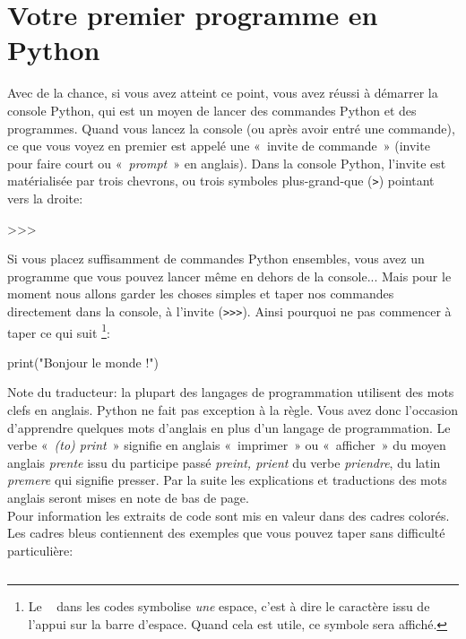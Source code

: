 \section{Votre premier programme en Python}

Avec de la chance, si vous avez atteint ce point, vous avez réussi à démarrer la console Python, qui est un moyen de lancer des commandes Python et des programmes. Quand vous lancez la console (ou après avoir entré une commande), ce que vous voyez en premier est appelé une «~invite de commande~» (invite pour faire court ou «~\emph{prompt}~» en anglais). 
Dans la console Python, l'invite est matérialisée par trois chevrons, ou trois symboles plus-grand-que (\verb+>+) pointant vers la droite:
\begin{Verbatim*}[frame=single,rulecolor=\color{gray}, label=ne pas saisir]
>>>
\end{Verbatim*}
Si vous placez suffisamment de commandes Python ensembles, vous avez un programme que vous pouvez lancer même en dehors de la console... Mais pour le moment nous allons garder les choses simples et taper nos commandes directement dans la console, à l'invite (\verb+>>>+).
\VerbatimFootnotes
Ainsi pourquoi ne pas commencer à taper ce qui suit
\footnote{Le \verb*+ + dans les codes symbolise \emph{une} espace, c'est à dire le caractère issu de l'appui sur la barre d'espace. Quand cela est utile, ce symbole sera affiché.}:

\begin{Verbatim*}[frame=single,rulecolor=\color{mbleu}, label=à taper]
print("Bonjour le monde !")
\end{Verbatim*}

Note du traducteur: la plupart des langages de programmation utilisent des mots clefs en anglais. Python ne fait pas exception à la règle. Vous avez donc l'occasion d'apprendre quelques mots d'anglais en plus d'un langage de programmation. Le verbe «~\emph{(to) print}~» signifie en anglais «~imprimer~» ou «~afficher~» du moyen anglais \emph{prente} issu du participe passé \emph{preint, prient} du verbe \emph{priendre}, du latin \emph{premere} qui signifie presser. Par la suite les explications et traductions des mots anglais seront mises en note de bas de page.\\

Pour information les extraits de code sont mis en valeur dans des cadres colorés. 
Les cadres bleus contiennent des exemples que vous pouvez taper sans difficulté particulière:

\begin{Verbatim}[frame=single,rulecolor=\color{mbleu}, label=à taper]

\end{Verbatim}

